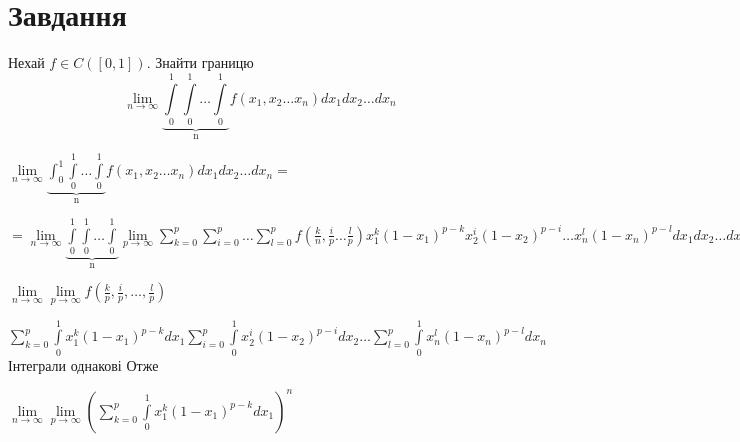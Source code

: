 
\chapter{Завдання \theHchapter}

\begin{tcolorbox}[title=Завдання]
    Нехай $f \in C([0,1])$. Знайти границю
    $$\lim_{n\rightarrow \infty}
    \underbrace{\int\limits_{0}^{1}\int\limits_{0}^{1}
    \dots\int\limits_{0}^{1}}_{\mbox{n}}
    f(x_1, x_2 \dots x_n) dx_1dx_2\dots dx_n $$
\end{tcolorbox}



$
\lim\limits_{n\rightarrow \infty}
\underbrace{\int_{0}^{1}\int\limits_{0}^{1}
\dots\int\limits_{0}^{1}}_{\mbox{n}}
f(x_1, x_2 \dots x_n) dx_1dx_2\dots dx_n=$


$=
\lim\limits_{n\rightarrow \infty}
\underbrace{\int\limits_{0}^{1}\int\limits_{0}^{1}
\dots\int\limits_{0}^{1}}_{\mbox{n}}
\lim\limits_{p\rightarrow \infty}
\sum\limits_{k = 0}^{p}
\sum\limits_{i = 0}^{p}
\dots
\sum\limits_{l = 0}^{p}
f(\frac{k}{n}, \frac{i}{p} \dots \frac{l}{p}) 
x_1^k(1- x_1)^{p - k}
x_2^i(1- x_2)^{p - i}
\dots
x_n^l(1- x_n)^{p - l}
dx_1dx_2\dots dx_n = 
$


$
\lim\limits_{n\rightarrow \infty}
\lim\limits_{p\rightarrow \infty}
f(\frac{k}{p}, \frac{i}{p}, \dots, \frac{l}{p})$


$
\sum\limits_{k = 0}^{p}\int\limits_{0}^{1}x_1^k(1- x_1)^{p - k}dx_1
\sum\limits_{i = 0}^{p}\int\limits_{0}^{1}x_2^i(1- x_2)^{p - i}dx_2
\dots
\sum\limits_{l = 0}^{p}\int\limits_{0}^{1}x_n^l(1- x_n)^{p - l}dx_n
$
Інтеграли однакові Отже


$ 
\lim\limits_{n\rightarrow \infty}
\lim\limits_{p\rightarrow \infty}
(\sum\limits_{k = 0}^{p}\int\limits_{0}^{1}x_1^k(1- x_1)^{p - k}dx_1)^n
$